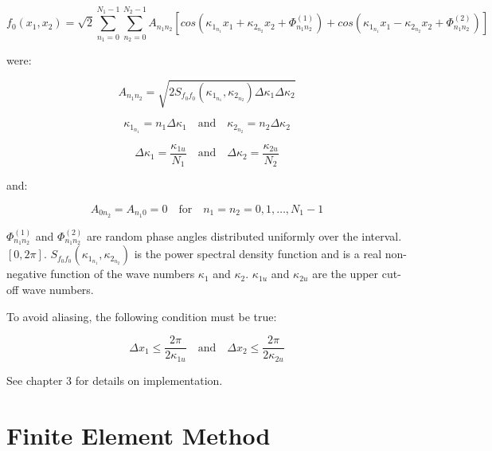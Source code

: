 \begin{equation}
\label{eq114}
	f_0(x_1,x_2) = \sqrt{2}\sum_{n_1=0}^{N_1-1} \sum_{n_2=0}^{N_2-1} A_{n_1 n_2} [cos(\kappa_{1_{n_1}} x_1 + \kappa_{2_{n_2}} x_2 + \Phi_{n_1 n_2}^{(1)}) + cos(\kappa_{1_{n_1}} x_1 - \kappa_{2_{n_2}} x_2 + \Phi_{n_1 n_2}^{(2)}) ]
\end{equation}

were:

\begin{equation}
\label{eq45}
	A_{n_1 n_2} = \sqrt{2S_{f_0 f_0}(\kappa_{1_{n_1}},\kappa_{2_{n_2}})\Delta\kappa_1\Delta\kappa_2}
\end{equation}

\begin{equation}
\label{eq47}
	\kappa_{1_{n_1}} = n_1 \Delta\kappa_1 \quad\text{and}\quad \kappa_{2_{n_2}} = n_2 \Delta\kappa_2
\end{equation}

\begin{equation}
\label{eq48}
	\Delta\kappa_1 = \frac{\kappa_{1u}}{N_1} \quad\text{and}\quad \Delta\kappa_2 = \frac{\kappa_{2u}}{N_2} 
\end{equation}

and:

\begin{equation}
\label{eq49}
	A_{{0}n_2} = A_{{n_1}0} = 0 \quad\text{for}\quad n_1 = n_2 = 0,1,\dots,N_1-1
\end{equation}

$\Phi_{n_1 n_2}^{(1)}$ and $\Phi_{n_1 n_2}^{(2)}$ are random phase angles distributed uniformly over the interval. $[0,2\pi]$. $S_{f_0 f_0}(\kappa_{1_{n_1}},\kappa_{2_{n_2}})$
is the power spectral density function and is a real non-negative function of the wave numbers $\kappa_1$ and $\kappa_2$.
$\kappa_{1u}$ and $\kappa_{2u}$ are the upper cut-off wave numbers.

To avoid aliasing, the following condition must be true:

\begin{equation}
\label{eq57}
	\Delta x_1 \leq \frac{2\pi}{2\kappa_{1u}} \quad\text{and}\quad \Delta x_2 \leq \frac{2\pi}{2\kappa_{2u}} 
\end{equation}

See chapter 3 for details on implementation.

\section{Finite Element Method}


